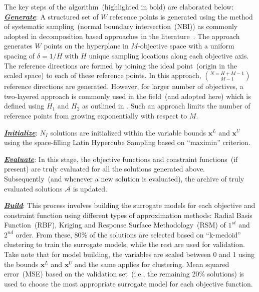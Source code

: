 \documentclass[twocolumn,10pt]{asme2ej}
\begin{document}
The key steps of the algorithm~(highlighted in bold) are elaborated below:\\

\noindent \underline{\it \textbf{Generate}}: A structured set of $W$ reference points is generated using the method of systematic sampling~(normal boundary intersection~(NBI)) as commonly adopted in decomposition based approaches in the literature~\cite{KHTdas1998normal,KHTjmd2017,KHTtrivedisurvey}. The approach generates $W$ points on the hyperplane in $M$-objective space with a uniform spacing of $\delta=1/H$ with $H$ unique sampling locations along each objective axis. The reference directions are formed by joining the ideal point~(origin in the scaled space) to each of these reference points. In this approach, $N = {H+M-1}\choose{M-1}$ reference directions are generated. However, for larger number of objectives, a two-layered approach is commonly used in the field~(and adopted here) which is defined using $H_1$ and $H_2$ as outlined in \cite{KHTLi2015dominance}. Such an approach limits the number of reference points from growing exponentially with respect to $M$.

	\noindent \underline{\it \textbf{Initialize}}: $N_I$ solutions are initialized within the variable bounds $\textbf{x}^{L}$ and $\textbf{x}^{U}$ using the space-filling Latin Hypercube Sampling based on ``maximin'' criterion.
	
	\noindent \underline{\it \textbf{Evaluate}}: In this stage, the objective functions and constraint functions~(if present) are truly evaluated for all the solutions generated above. Subsequently~(and whenever a new solution is evaluated), the archive of truly evaluated solutions $\mathcal{A}$ is updated. 
	
	
	\noindent \underline{\it \textbf{Build}}: This process involves building the surrogate models for each objective and constraint function using different types of approximation methods: Radial Basis Function~(RBF), Kriging and Response Surface Methodology~(RSM) of $1^{st}$ and $2^{nd}$ order. From these, 80\% of the solutions are selected based on ``k-medoid'' clustering to train the surrogate models, while the rest are used for validation. Take note that for model building, the variables are scaled between 0 and 1 using the bounds $\textbf{x}^{L}$ and $\textbf{x}^{U}$ and the same applies for clustering. Mean squared error~(MSE) based on the validation set~(i.e., the remaining 20\% solutions) is used to choose the most appropriate surrogate model for each objective function. 
	
\end{document}
